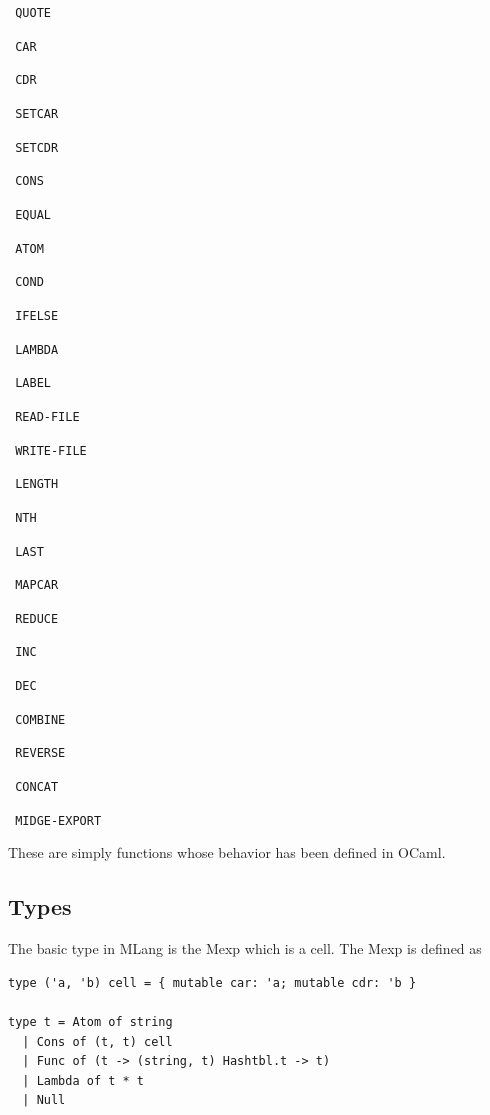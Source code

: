 \documentclass[letterpaper,11pt]{article}
\begin{document}
{\begin{list}{}{}
\item \texttt{  QUOTE }
\item \texttt{ CAR }
\item \texttt{ CDR }
\item \texttt{  SETCAR }
\item \texttt{ SETCDR }
\item \texttt{ CONS }
\item \texttt{  EQUAL }
\item \texttt{ ATOM }
\item \texttt{ COND }
\item \texttt{  IFELSE }
\item \texttt{  LAMBDA }
\item \texttt{  LABEL }
\item \texttt{ READ-FILE }
\item \texttt{ WRITE-FILE }
\item \texttt{  LENGTH }
\item \texttt{  NTH }
\item \texttt{  LAST }
\item \texttt{  MAPCAR }
\item \texttt{  REDUCE }
\item \texttt{  INC }
\item \texttt{ DEC }
\item \texttt{  COMBINE }
\item \texttt{ REVERSE }
\item \texttt{ CONCAT }
\item \texttt{ MIDGE-EXPORT }
 \end{list}
These are simply functions whose behavior has been defined in OCaml.

\subsection{Types}


The basic type in MLang is the Mexp which is a cell. The Mexp is defined as

\lstset{breaklines=true,language=ml}
\begin{lstlisting}
type ('a, 'b) cell = { mutable car: 'a; mutable cdr: 'b }

type t = Atom of string
  | Cons of (t, t) cell
  | Func of (t -> (string, t) Hashtbl.t -> t)
  | Lambda of t * t
  | Null

\end{lstlisting}


}
\end{document}
